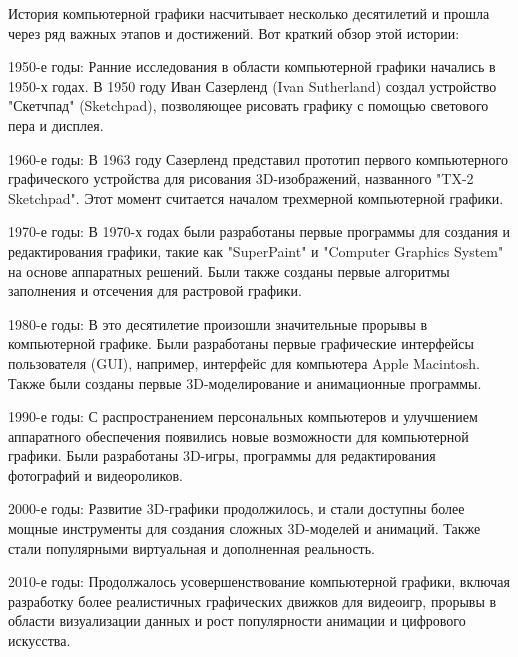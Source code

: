 \documentclass{beamer}
\begin{document}
	\begin{frame}
	
	История компьютерной графики насчитывает несколько десятилетий и прошла через ряд важных этапов и достижений. Вот краткий обзор этой истории:
	
	1950-е годы: Ранние исследования в области компьютерной графики начались в 1950-х годах. В 1950 году Иван Сазерленд (Ivan Sutherland) создал устройство "Скетчпад" (Sketchpad), позволяющее рисовать графику с помощью светового пера и дисплея.
	
	1960-е годы: В 1963 году Сазерленд представил прототип первого компьютерного графического устройства для рисования 3D-изображений, названного "TX-2 Sketchpad". Этот момент считается началом трехмерной компьютерной графики.
	
	1970-е годы: В 1970-х годах были разработаны первые программы для создания и редактирования графики, такие как "SuperPaint" и "Computer Graphics System" на основе аппаратных решений. Были также созданы первые алгоритмы заполнения и отсечения для растровой графики.
	
	1980-е годы: В это десятилетие произошли значительные прорывы в компьютерной графике. Были разработаны первые графические интерфейсы пользователя (GUI), например, интерфейс для компьютера Apple Macintosh. Также были созданы первые 3D-моделирование и анимационные программы.
	
	1990-е годы: С распространением персональных компьютеров и улучшением аппаратного обеспечения появились новые возможности для компьютерной графики. Были разработаны 3D-игры, программы для редактирования фотографий и видеороликов.
	
	2000-е годы: Развитие 3D-графики продолжилось, и стали доступны более мощные инструменты для создания сложных 3D-моделей и анимаций. Также стали популярными виртуальная и дополненная реальность.
	
	2010-е годы: Продолжалось усовершенствование компьютерной графики, включая разработку более реалистичных графических движков для видеоигр, прорывы в области визуализации данных и рост популярности анимации и цифрового искусства.
	\fi
		
	\end{frame}
	
\end{document}
